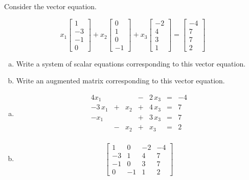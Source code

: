 
\begin{exerciseStatement}


Consider the vector equation.

\[ x_{1} \left[\begin{array}{c}
1 \\
-3 \\
-1 \\
0
\end{array}\right] + x_{2} \left[\begin{array}{c}
0 \\
1 \\
0 \\
-1
\end{array}\right] + x_{3} \left[\begin{array}{c}
-2 \\
4 \\
3 \\
1
\end{array}\right] = \left[\begin{array}{c}
-4 \\
7 \\
7 \\
2
\end{array}\right] \]
\begin{enumerate}[(a)]
\item  Write a system of scalar equations corresponding to this vector equation. 
\item  Write an augmented matrix corresponding to this vector equation. 
\end{enumerate}
    
\end{exerciseStatement}
    
\begin{exerciseAnswer} 

\begin{enumerate}[(a)]
\item 
\begin{alignat*}{4} x_{1} & &  &-& 2 \, x_{3} &=& -4 \\-3 \, x_{1} &+& x_{2} &+& 4 \, x_{3} &=& 7 \\-x_{1} & &  &+& 3 \, x_{3} &=& 7 \\ &-& x_{2} &+& x_{3} &=& 2 \\ \end{alignat*}
            
\item \[ \left[\begin{array}{ccc|c}
1 & 0 & -2 & -4 \\
-3 & 1 & 4 & 7 \\
-1 & 0 & 3 & 7 \\
0 & -1 & 1 & 2
\end{array}\right] \]
\end{enumerate}
    
\end{exerciseAnswer}
    
